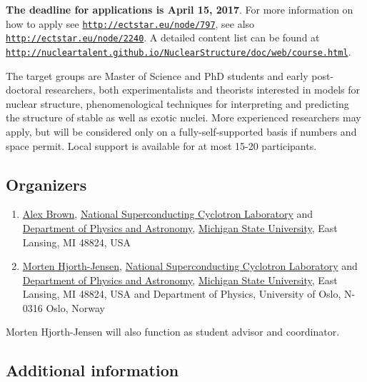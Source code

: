\documentclass[%
oneside,                 %
final,                   %
10pt]{article}
\begin{document}
\textbf{The deadline for applications is April 15, 2017}.  
For more information on how  to apply see \href{{http://ectstar.eu/node/797}}{\nolinkurl{http://ectstar.eu/node/797}},
see also \href{{http://ectstar.eu/node/2240}}{\nolinkurl{http://ectstar.eu/node/2240}}. A detailed content list can be found at
\href{{http://nucleartalent.github.io/NuclearStructure/doc/web/course.html}}{\nolinkurl{http://nucleartalent.github.io/NuclearStructure/doc/web/course.html}}.

The target groups are Master of Science and PhD students and
early post-doctoral researchers, both experimentalists and
theorists interested in models for nuclear
structure, phenomenological techniques for interpreting and predicting
the structure of stable as well as exotic nuclei. More experienced researchers may apply, but will be
considered only on a fully-self-supported basis if numbers and space
permit. Local support is available for at most 15-20 participants.



\subsection{Organizers}

\begin{enumerate}
\item \href{{https://people.nscl.msu.edu/~brown/}}{Alex Brown}, \href{{http://www.nscl.msu.edu/}}{National Superconducting Cyclotron Laboratory} and \href{{https://www.pa.msu.edu/}}{Department of Physics and Astronomy}, \href{{http://www.msu.edu/}}{Michigan State University}, East Lansing, MI 48824, USA

\item \href{{http://mhjgit.github.io/info/doc/web/}}{Morten Hjorth-Jensen}, \href{{http://www.nscl.msu.edu/}}{National Superconducting Cyclotron Laboratory} and \href{{https://www.pa.msu.edu/}}{Department of Physics and Astronomy}, \href{{http://www.msu.edu/}}{Michigan State University}, East Lansing, MI 48824, USA and Department of Physics, University of Oslo, N-0316 Oslo, Norway 
\end{enumerate}

\noindent
Morten Hjorth-Jensen will also function as student advisor and coordinator.

\subsection{Additional information}
\end{document}
